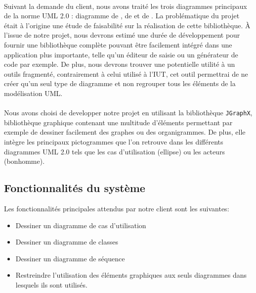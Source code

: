 \documentclass[12pt,a4paper,openany]{report}
\begin{document}
	\paragraph{}
	Suivant la demande du client, nous avons traité les trois diagrammes principaux de la norme UML 2.0 :
	diagramme de , de 
	 et de .
	La problématique du projet était à l'origine une étude de faisabilité sur la réalisation de cette bibliothèque.
	À l'issue de notre projet, nous devrons estimé une durée de développement pour fournir une bibliothèque complète
	pouvant être facilement intégré dans une application plus importante, telle qu'un éditeur de saisie ou un générateur de code par exemple.
	De plus, nous devrons trouver une potentielle utilité à un outils fragmenté, contrairement à celui utilisé à l'IUT,
	cet outil permettrai de ne créer qu'un seul type de diagramme et non regrouper tous les éléments de la modélisation UML.

	\paragraph{}
	Nous avons choisi de developper notre projet en utilisant la bibliothèque \texttt{JGraphX},
	bibliothèque graphique contenant une multitude d'éléments permettant
	par exemple de dessiner facilement des graphes ou des organigrammes. De plus, elle intègre les principaux 
	pictogrammes que l'on retrouve dans les différents diagrammes UML 2.0 tels que les cas d'utilisation (ellipse)
	ou les acteurs (bonhomme).
\newpage
	\subsection{Fonctionnalités du système}
	Les fonctionnalités principales attendus par notre client sont les suivantes:
	\begin{itemize}
		\item Dessiner un diagramme de cas d'utilisation
		\item Dessiner un diagramme de classes
		\item Dessiner un diagramme de séquence 
		\item Restreindre l'utilisation des éléments graphiques aux seuls diagrammes dans lesquels ils sont utilisés.  \end{itemize}
\end{document}
